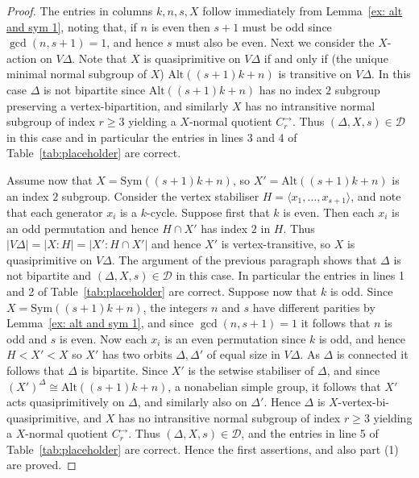 \documentclass[11pt]{amsart}
\newcommand\DD{{\mathscr{D}}}
\newcommand{\Sym}{\mathrm{Sym}}
\newcommand{\Alt}{\mathrm{Alt}}
\begin{document}
\begin{proof}
The entries in columns $k, n, s, X$ follow immediately from Lemma~\ref{ex: alt and sym 1}, noting  that, if $n$ is even then $s+1$ must be odd since $\gcd(n,s+1)=1$, and hence $s$ must also be even.   Next we consider the $X$-action on $V\Delta$. Note that $X$ is quasiprimitive on $V\Delta$ if and only if (the unique minimal normal subgroup of $X$)  $\Alt((s+1)k+n)$ is transitive on $V\Delta$. In this case $\Delta$ is not bipartite since $\Alt((s+1)k+n)$ has no index $2$ subgroup preserving a vertex-bipartition, and similarly $X$ has no intransitive normal subgroup of index $r\geq3$ yielding a $X$-normal quotient $C_r^\to$. Thus $(\Delta, X, s)\in\DD$ in this case and in particular the entries in lines 3 and 4 of Table~\ref{tab:placeholder} are correct.

Assume now that $X= \Sym((s+1)k+n)$, so $X'=\Alt((s+1)k+n)$ is an index $2$ subgroup.  Consider the vertex stabiliser \(H=\langle x_1,\ldots,x_{s+1}\rangle\), and note that each generator $x_i$ is a $k$-cycle. Suppose first that $k$ is even. Then each $x_i$ is an odd permutation and hence $H\cap X'$ has index $2$ in $H$. Thus $|V\Delta|=|X:H|=|X':H\cap X'|$ and hence $X'$ is vertex-transitive, so $X$ is quasiprimitive on $V\Delta$. The argument of the previous paragraph shows that $\Delta$ is not bipartite and $(\Delta, X, s)\in\DD$ in this case. In particular the entries in lines 1 and 2 of  Table~\ref{tab:placeholder} are correct. 
%
Suppose now that $k$ is odd. Since $X= \Sym((s+1)k+n)$, the integers $n$ and $s$ have different parities by Lemma~\ref{ex: alt and sym 1}, and since $\gcd(n,s+1)=1$ it follows that $n$ is odd and $s$ is even. Now each $x_i$ is an even permutation since $k$ is odd, and hence $H< X'<X$ so $X'$ has two orbits $\Delta, \Delta'$ of equal size in $V\Delta$. As $\Delta$ is connected it follows that $\Delta$ is bipartite. Since $X'$ is the setwise stabiliser of $\Delta$, and since $(X')^\Delta\cong \Alt((s+1)k+n)$, a nonabelian simple group, it follows that $X'$ acts quasiprimitively on $\Delta$, and similarly also on $\Delta'$. Hence \(\Delta\) is \(X\)-vertex-bi-quasiprimitive, and $X$ has no intransitive normal subgroup of index $r\geq3$ yielding a $X$-normal quotient $C_r^\to$. Thus $(\Delta, X, s)\in\DD$, and the entries in line 5 of  Table~\ref{tab:placeholder} are correct. Hence the first assertions, and also part (1) are proved.


\end{proof}
\end{document}
